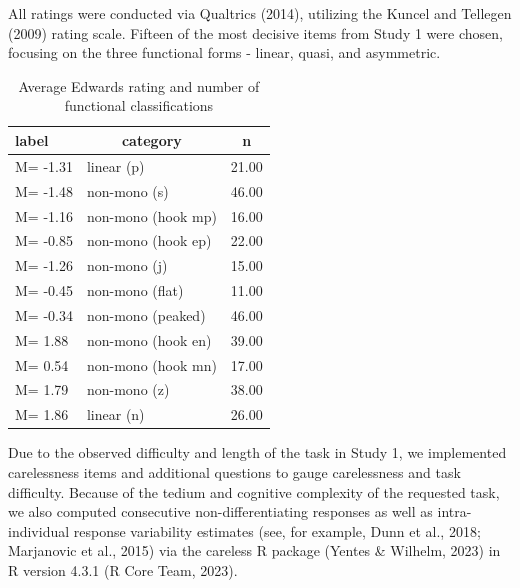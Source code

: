 \documentclass[
  ,jou]{apa6}
\begin{document}
All ratings were conducted via Qualtrics (2014), utilizing the Kuncel and Tellegen (2009) rating scale. Fifteen of the most decisive items from Study 1 were chosen, focusing on the three functional forms - linear, quasi, and asymmetric.

\begin{table}[tbp]

\begin{center}
\begin{threeparttable}

\caption{\label{tab:qsorttable}Average Edwards rating and number of functional classifications}

\begin{tabular}{lll}
\toprule
label & \multicolumn{1}{c}{category} & \multicolumn{1}{c}{n}\\
\midrule
M= -1.31 & linear (p) & 21.00\\
M= -1.48 & non-mono (s) & 46.00\\
M= -1.16 & non-mono (hook mp) & 16.00\\
M= -0.85 & non-mono (hook ep) & 22.00\\
M= -1.26 & non-mono (j) & 15.00\\
M= -0.45 & non-mono (flat) & 11.00\\
M= -0.34 & non-mono (peaked) & 46.00\\
M= 1.88 & non-mono (hook en) & 39.00\\
M= 0.54 & non-mono (hook mn) & 17.00\\
M= 1.79 & non-mono (z) & 38.00\\
M= 1.86 & linear (n) & 26.00\\
\bottomrule
\end{tabular}

\end{threeparttable}
\end{center}

\end{table}

Due to the observed difficulty and length of the task in Study 1, we implemented carelessness items and additional questions to gauge carelessness and task difficulty. Because of the tedium and cognitive complexity of the requested task, we also computed consecutive non-differentiating responses as well as intra-individual response variability estimates (see, for example, Dunn et al., 2018; Marjanovic et al., 2015) via the careless R package (Yentes \& Wilhelm, 2023) in R version 4.3.1 (R Core Team, 2023).
\end{document}
